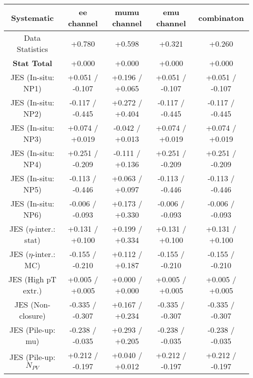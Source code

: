\begin{table}[htbp]
\scriptsize
  \begin{center} 
  \begin{tabular}{|c|c|c|c|c|}
  \hline
Systematic                            &  ee channel&  mumu channel&  emu channel&  combinaton\\
  \hline
Data Statistics                       &+0.780              & +0.598              & +0.321              & +0.260             \\
\hline
\textbf{Stat Total}                   &+0.000              & +0.000              & +0.000              & +0.000             \\
\hline
JES (In-situ: NP1)                    &+0.051   / -0.107   & +0.196   / +0.065   & +0.051   / -0.107   & +0.051   / -0.107  \\
JES (In-situ: NP2)                    &-0.117   / -0.445   & +0.272   / +0.404   & -0.117   / -0.445   & -0.117   / -0.445  \\
JES (In-situ: NP3)                    &+0.074   / +0.019   & -0.042   / +0.013   & +0.074   / +0.019   & +0.074   / +0.019  \\
JES (In-situ: NP4)                    &+0.251   / -0.209   & -0.111   / +0.136   & +0.251   / -0.209   & +0.251   / -0.209  \\
JES (In-situ: NP5)                    &-0.113   / -0.446   & +0.063   / +0.097   & -0.113   / -0.446   & -0.113   / -0.446  \\
JES (In-situ: NP6)                    &-0.006   / -0.093   & +0.173   / +0.330   & -0.006   / -0.093   & -0.006   / -0.093  \\
JES ($\eta$-inter.: stat)               &+0.131   / +0.100   & +0.199   / +0.334   & +0.131   / +0.100   & +0.131   / +0.100  \\
JES ($\eta$-inter.: MC)                 &-0.155   / -0.210   & +0.112   / +0.187   & -0.155   / -0.210   & -0.155   / -0.210  \\
JES (High pT extr.)                  &+0.005   / +0.005   & +0.000   / +0.000   & +0.005   / +0.005   & +0.005   / +0.005  \\
JES (Non-closure)                     &-0.335   / -0.307   & +0.167   / +0.234   & -0.335   / -0.307   & -0.335   / -0.307  \\
JES (Pile-up: mu)                     &-0.238   / -0.035   & +0.293   / +0.205   & -0.238   / -0.035   & -0.238   / -0.035  \\
JES (Pile-up: $N_{PV}$                  &+0.212   / -0.197   & +0.040   / +0.012   & +0.212   / -0.197   & +0.212   / -0.197  \\

\end{tabular}
\end{center}
\end{table}
